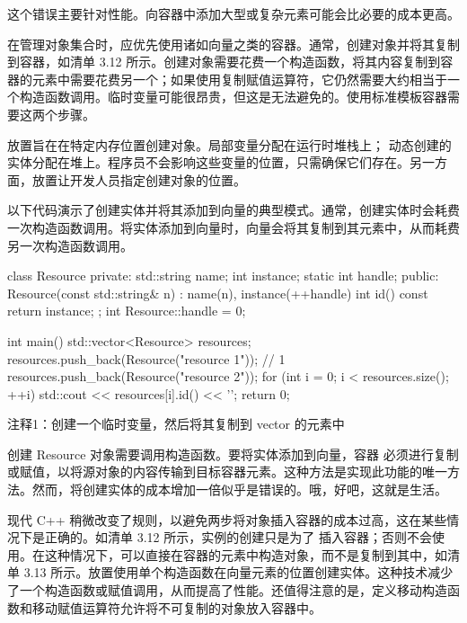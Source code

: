 这个错误主要针对性能。向容器中添加大型或复杂元素可能会比必要的成本更高。


在管理对象集合时，应优先使用诸如向量之类的容器。通常，创建对象并将其复制到容器，如清单 3.12 所示。创建对象需要花费一个构造函数，将其内容复制到容器的元素中需要花费另一个；如果使用复制赋值运算符，它仍然需要大约相当于一个构造函数调用。临时变量可能很昂贵，但这是无法避免的。使用标准模板容器需要这两个步骤。

放置旨在在特定内存位置创建对象。局部变量分配在运行时堆栈上； 动态创建的实体分配在堆上。程序员不会影响这些变量的位置，只需确保它们存在。另一方面，放置让开发人员指定创建对象的位置。

以下代码演示了创建实体并将其添加到向量的典型模式。通常，创建实体时会耗费一次构造函数调用。将实体添加到向量时，向量会将其复制到其元素中，从而耗费另一次构造函数调用。


\begin{cpp}
class Resource {
private:
  std::string name;
  int instance;
  static int handle;
public:
  Resource(const std::string& n) : name(n), instance(++handle) {}
  int id() const { return instance; }
};
int Resource::handle = 0;

int main() {
  std::vector<Resource> resources;
  resources.push_back(Resource("resource 1")); // 1
  resources.push_back(Resource("resource 2"));
  for (int i = 0; i < resources.size(); ++i)
    std::cout << resources[i].id() << '\n';
  return 0;
}
\end{cpp}

{\footnotesize
注释1：创建一个临时变量，然后将其复制到 vector 的元素中
}


创建 Resource 对象需要调用构造函数。要将实体添加到向量，容器 必须进行复制或赋值，以将源对象的内容传输到目标容器元素。这种方法是实现此功能的唯一方法。然而，将创建实体的成本增加一倍似乎是错误的。哦，好吧，这就是生活。


现代 C++ 稍微改变了规则，以避免两步将对象插入容器的成本过高，这在某些情况下是正确的。如清单 3.12 所示，实例的创建只是为了 插入容器；否则不会使用。在这种情况下，可以直接在容器的元素中构造对象，而不是复制到其中，如清单 3.13 所示。放置使用单个构造函数在向量元素的位置创建实体。这种技术减少了一个构造函数或赋值调用，从而提高了性能。还值得注意的是，定义移动构造函数和移动赋值运算符允许将不可复制的对象放入容器中。

